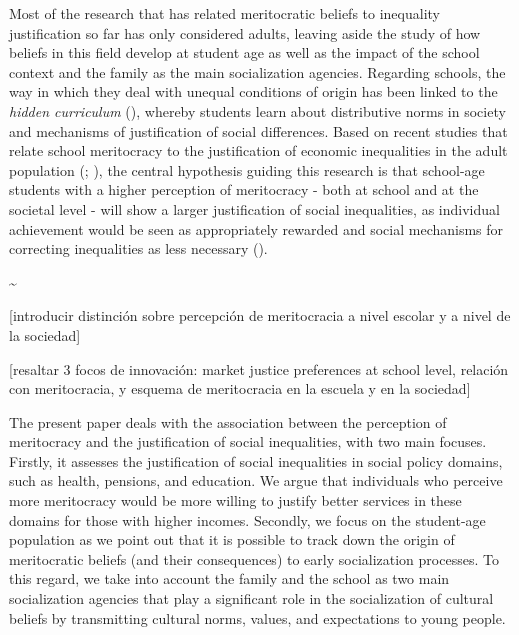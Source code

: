 \documentclass[
  letterpaper,
  DIV=11,
  numbers=noendperiod]{scrartcl}
\begin{document}
Most of the research that has related meritocratic beliefs to inequality
justification so far has only considered adults, leaving aside the study
of how beliefs in this field develop at student age as well as the
impact of the school context and the family as the main socialization
agencies. Regarding schools, the way in which they deal with unequal
conditions of origin has been linked to the \emph{hidden curriculum}
(), whereby students
learn about distributive norms in society and mechanisms of
justification of social differences. Based on recent studies that relate
school meritocracy to the justification of economic inequalities in the
adult population (; ),
the central hypothesis guiding this research is that school-age students
with a higher perception of meritocracy - both at school and at the
societal level - will show a larger justification of social
inequalities, as individual achievement would be seen as appropriately
rewarded and social mechanisms for correcting inequalities as less
necessary ().

\textasciitilde{}

{[}introducir distinción sobre percepción de meritocracia a nivel
escolar y a nivel de la sociedad{]}

{[}resaltar 3 focos de innovación: market justice preferences at school
level, relación con meritocracia, y esquema de meritocracia en la
escuela y en la sociedad{]}

The present paper deals with the association between the perception of
meritocracy and the justification of social inequalities, with two main
focuses. Firstly, it assesses the justification of social inequalities
in social policy domains, such as health, pensions, and education. We
argue that individuals who perceive more meritocracy would be more
willing to justify better services in these domains for those with
higher incomes. Secondly, we focus on the student-age population as we
point out that it is possible to track down the origin of meritocratic
beliefs (and their consequences) to early socialization processes. To
this regard, we take into account the family and the school as two main
socialization agencies that play a significant role in the socialization
of cultural beliefs by transmitting cultural norms, values, and
expectations to young people.
\end{document}
